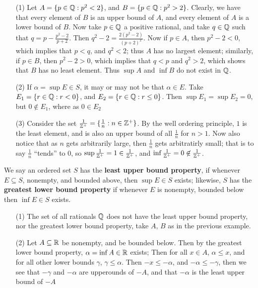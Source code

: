 \begin{example}
  \begin{enumerate}
    \item[(1)] Let $A=\{p \in \mathbb{Q}: p^2<2\}$, and $B=\{p \in \mathbb{Q}: p^2>2\}$. Clearly,
      we have that every element of $B$ is an upper bound of $A$, and every
      element of $A$ is a lower bound of  $B$. Now take  $p \in \mathbb{Q}$ a positive
      rational, and take  $q \in \mathbb{Q}$ such that $q=p-\frac{p^2-2}{p+2}$. Then
      $q^2-2=\frac{2(p^2-2)}{(p+2)^2}$. Now if $p \in A$, then  $p^2-2<0$,
      which implies that  $p<q$, and $q^2<2$; thus $A$ has no largest element;
      similarly, if  $p \in B$, then  $p^2-2>0$, which implies that  $q<p$ and
      $q^2>2$, which shows that  $B$ has no least element. Thus $\sup{A}$ and  $\inf{B}$ do not exist in $\mathbb{Q}$.

    \item[(2)] If  $\alpha = \sup{E} \in S$, it may or may not be that  $\alpha
      \in E$. Take $E_1=\{r \in \mathbb{Q}: r<0\}$, and  $E_2=\{r \in \mathbb{Q}: r \leq 0\}$.
      Then $\sup{E_1}=\sup{E_2}=0$, but $0 \not\in E_1$, where as $0 \in E_2$

    \item[(3)] Consider the set $ \frac{1}{\mathbb{Z}^+}=\{\frac{1}{n}: n \in \mathbb{Z}^+\}$. By
      the well ordering principle, $1$ is the least element, and is also an
      upper bound of all  $ \frac{1}{n}$ for $n>1$. Now also notice that as $n$
      gets arbitrarily large, then  $ \frac{1}{n}$ gets arbitratirly small;
      that is to say $\frac{1}{n}$ ``tends'' to $0$, so  $\sup{\frac{1}{\mathbb{Z}^+}}=1
      \in \frac{1}{\mathbb{Z}^+}$, and $\inf{\frac{1}{\mathbb{Z}^+}}=0 \not\in \frac{1}{\mathbb{Z}^+}$.
  \end{enumerate}
\end{example}

\begin{definition}
  We say an ordered set $S$ has the \textbf{least upper bound property}, if
  whenever $E \subseteq S$, nonempty, and bounded above, then  $\sup{E} \in S$
  exists; likewise, $S$ has the \textbf{greatest lower bound property} if
  whenever $E$ is nonempty, bounded below then $\inf{E} \in S$ exists.
\end{definition}

\begin{example}
  \begin{enumerate}
    \item[(1)] The set of all rationals $\mathbb{Q}$ does not have the least upper
      bound property, nor the greatest lower bound property, take $A$,  $B$
      as in the previous example.

    \item[(2)] Let $A \subseteq \mathbb{R}$ be nonempty, and be bounded below. Then by
      the greatest lower bound property,  $\alpha=\inf{A} \in \mathbb{R}$ exists; Then
      for all  $x \in A$, $\alpha \leq x$, and for all other lower bounds  $\gamma$,
      $\gamma \leq \alpha$. Then $-x \leq -\alpha$, and  $-\alpha \leq -\gamma$,
      then we see that  $-\gamma$ and  $-\alpha$ are upperounds of  $-A$, and that
      $-\alpha$ is the least upper bound of $-A$
  \end{enumerate}
\end{example}

